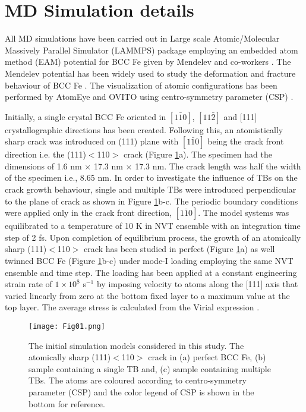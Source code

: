 \documentclass[smallextended]{svjour3}       %
\renewcommand\hl[1]{#1}
\begin{document}
\section{MD Simulation details}
\label{Details}

All MD simulations have been carried out in Large scale Atomic/Molecular Massively Parallel Simulator (LAMMPS) package 
\cite{plimpton1995fast} employing an embedded atom method (EAM) potential for BCC Fe given by Mendelev and co-workers 
\cite{mendelev2003development}. The Mendelev potential has been widely used to study the deformation and fracture behaviour 
of BCC Fe \cite{sainath2016deformation,terentyev2013blunting,kedharnath2017molecular,sainath2017atomistic,sainath2016directional}. 
The visualization of atomic configurations has been performed by AtomEye \cite{li2003atomeye} and OVITO 
\cite{stukowski2009visualization} using centro-symmetry parameter (CSP) \cite{kelchner1998dislocation}.

Initially, a single crystal BCC Fe oriented in $[1\bar10]$, $[11\bar2]$ and [111] crystallographic directions has been 
created. Following this, an atomistically sharp crack was introduced on (111) plane with $[1\bar10]$ being the crack 
front direction i.e. the (111)$<$110$>$ crack (Figure \ref{Initial}a). The specimen had the dimensions of 1.6 nm $\times$ 
17.3 nm $\times$ 17.3 nm. The crack length was half the width of the specimen i.e., 8.65 nm. In order to investigate the 
influence of TBs on the crack growth behaviour, single and multiple TBs were introduced perpendicular to the plane of 
crack as shown in Figure \ref{Initial}b-c. The periodic boundary conditions were applied only in the crack front direction, 
$[1\bar10]$. The model systems was equilibrated to a temperature of 10 K in NVT ensemble \hl{with an integration time step 
of 2 fs}. Upon completion of equilibrium process, the growth of an atomically sharp (111)$<$110$>$ crack has been studied in 
perfect (Figure \ref{Initial}a) as well twinned BCC Fe (Figure \ref{Initial}b-c) under mode-I loading \hl{employing the same NVT 
ensemble and time step}. The loading has been applied at a constant engineering strain 
rate of $1\times10^8$ s$^{-1}$ by imposing velocity to atoms along the [111] axis that varied linearly from zero at the 
bottom \hl{fixed layer} to a maximum value at the top layer. The average stress is calculated from the Virial expression 
\cite{zimmerman2004calculation}.

\begin{figure}[h]
\centering
\texttt{[image: Fig01.png]}
\caption {\small The initial simulation models considered in this study. The atomically sharp (111)$<$110$>$ crack in (a) 
perfect BCC Fe, (b) sample containing a single TB and, (c) sample containing multiple TBs. The atoms are coloured according 
to centro-symmetry parameter (CSP) \cite{kelchner1998dislocation} \hl{and the color legend of CSP is shown in the bottom for 
reference}.}
\label{Initial}
\end{figure}
\end{document}

